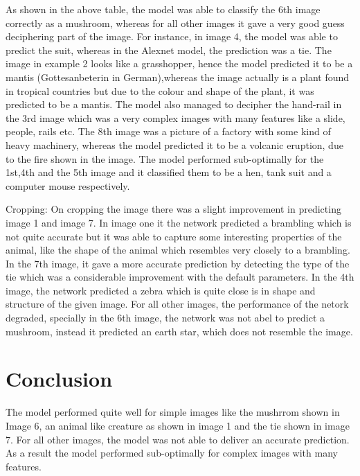 \documentclass[conference]{IEEEtran}
\begin{document}
As shown in the above table, the model was able to classify the 6th image correctly as a mushroom, whereas for all other images it gave a very good guess deciphering part of the image. For instance, in image 4, the model was able to predict the suit, whereas in the Alexnet model, the prediction was a tie. The image in example 2 looks like a grasshopper, hence  the model predicted it to be a mantis (Gottesanbeterin in German),whereas the image actually is a plant found in tropical countries but due to the colour and shape of the plant, it was predicted to be a mantis. The model also managed to decipher the hand-rail in the 3rd image which was a very complex images with many features like a slide, people, rails etc. The 8th image was a picture of a factory with some kind of heavy machinery, whereas the model predicted it to be a volcanic eruption, due to the fire shown in the image. The model performed sub-optimally for the 1st,4th and the 5th image and it  classified them to be a hen, tank suit and a computer mouse respectively. 

Cropping: On cropping the image there was a slight improvement  in predicting image 1 and image 7. In image one it the network predicted a brambling  which is not quite accurate but it was able to capture some interesting properties of the animal, like the shape of the animal which resembles very closely to a brambling. In the 7th image, it gave a more accurate prediction by detecting the type of the tie which was a considerable improvement with the default parameters. In the 4th image, the network predicted a zebra which is quite close is in shape and structure of the given image. For all other images, the performance of the netork degraded, specially in the 6th image, the network was not abel to predict a mushroom, instead it predicted an earth star, which does not resemble the image. 



\section{Conclusion}

The model performed quite well for simple images like the mushrrom shown in Image 6, an animal like creature as shown in image 1 and the tie shown in image 7. For all other images, the model was not able to deliver an accurate prediction. As a result  the model performed sub-optimally for complex images with many features.  
\end{document}
